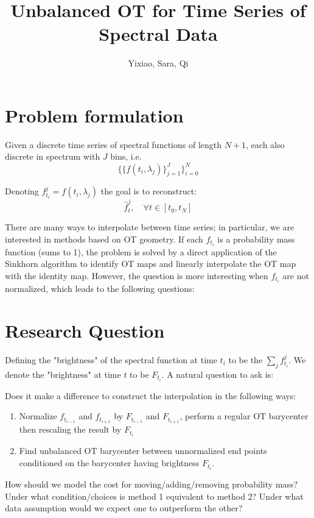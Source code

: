\documentclass{article}
\title{Unbalanced OT for Time Series of Spectral Data}
\author{Yixiao, Sara, Qi}
\begin{document}
\maketitle

\section{Problem formulation}
Given a discrete time series of spectral functions of length $N+1$, each also discrete in spectrum with $J$ bins, i.e.
\begin{equation}
    \bigg\{ \Big\{f(t_i,\lambda_j)\Big\}_{j=1}^J\bigg\}_{i=0}^N
\end{equation}

Denoting $f_{t_i}^j = f(t_i,\lambda_j)$ the goal is to reconstruct:
\begin{equation}
    \hat{f}_t^j, \quad \forall t \in [t_0,t_N]
\end{equation}

There are many ways to interpolate between time series; in particular, we are interested in methods based on OT geometry. If each $f_{t_i}$ is a probability mass function (sums to 1), the problem is solved by a direct application of the Sinkhorn algorithm to identify OT maps and linearly interpolate the OT map with the identity map. However, the question is more interesting when $f_{t_i}$ are not normalized, which leads to the following questions:

\section{Research Question}
Defining the "brightness" of the spectral function at time $t_i$ to be the $\sum_{j} f_{t_i}^j$. We denote the "brightness" at time $t$ to be $F_{t_i}$. A natural question to ask is: 

Does it make a difference to construct the interpolation in the following ways:
\begin{enumerate}
    \item Normalize $f_{t_{i-1}}$ and $f_{t_{i+1}}$ by $F_{t_{i-1}}$ and $F_{t_{i+1}}$, perform a regular OT barycenter then rescaling the result by $F_{t_i}$
    \item Find unbalanced OT barycenter between unnormalized end points conditioned on the barycenter having brightness $F_{t_i}$.
\end{enumerate}

How should we model the cost for moving/adding/removing probability mass? Under what condition/choices is method 1 equivalent to method 2? Under what data assumption would we expect one to outperform the other?
\end{document}
